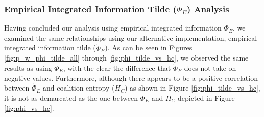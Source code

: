 \documentclass[a4paper,11pt]{article}
\begin{document}
\subsubsection{Empirical Integrated Information Tilde ($\widetilde{\Phi}_E$) Analysis}
\label{sec:app:snn:res:phi-tilde}
Having concluded our analysis using empirical integrated information $\Phi_E$, we examined the same relationships using our alternative implementation, empirical integrated information tilde ($\widetilde{\Phi}_E$). As can be seen in Figures \ref{fig:p_w_phi_tilde_all} through \ref{fig:phi_tilde_vs_hc}, we observed the same results as using $\Phi_E$, with the clear the difference that $\widetilde{\Phi}_E$ does not take on negative values. Furthermore, although there appears to be a positive correlation between $\widetilde{\Phi}_E$ and coalition entropy ($H_C$) as shown in Figure \ref{fig:phi_tilde_vs_hc}, it is not as demarcated as the one between $\Phi_E$ and $H_C$ depicted in Figure \ref{fig:phi_vs_hc}.

\end{document}
